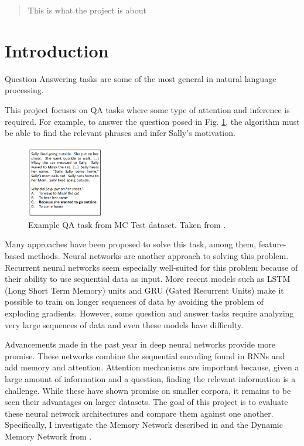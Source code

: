 \documentclass{article}
\begin{document}
\maketitle
\begin{abstract}
This is what the project is about
\end{abstract}

\section{Introduction}

Question Answering tasks are some of the most general in natural language processing.          

This project focuses on QA tasks where some type of attention and inference is required.  For example, to answer the question posed in Fig. \ref{Fig:MC_Test}, the algorithm must be able to find the relevant phrases and infer Sally's motivation.  

\begin{figure}[!ht]
\label{Fig:MC_Test}
  \centering
    \includegraphics[width=0.3\textwidth]{images/mc_test}
      \caption{Example QA task from MC Test dataset.  Taken from \cite{karthik}.}    
\end{figure}

Many approaches have been proposed to solve this task, among them, feature-based methods.  Neural networks are another approach to solving this problem.  Recurrent neural networks seem especially well-suited for this problem because of their ability to use sequential data as input.  More recent models such as LSTM (Long Short Term Memory) units and GRU (Gated Recurrent Units) make it possible to train on longer sequences of data by avoiding the problem of exploding gradients.  However, some question and answer tasks require analyzing very large sequences of data and even these models have difficulty.  

Advancements made in the past year in deep neural networks provide more promise.  These networks combine the sequential encoding found in RNNs and add memory and attention.  Attention mechanisms are important because, given a large amount of information and a question, finding the relevant information is a challenge.  While these have shown promise on smaller corpora, it remains to be seen their advantages on larger datasets.  The goal of this project is to evaluate these neural network architectures and compare them against one another.  Specifically, I investigate the Memory Network described in \cite{Memory_Networks} and the Dynamic Memory Network from \cite{dmn}.
\end{document}
